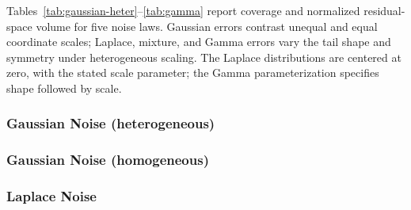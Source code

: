 Tables~\ref{tab:gaussian-heter}--\ref{tab:gamma} report coverage and
normalized residual-space volume for five noise laws. Gaussian errors
contrast unequal and equal coordinate scales; Laplace, mixture, and Gamma
errors vary the tail shape and symmetry under heterogeneous scaling.
The Laplace distributions are centered at zero, with the stated scale
parameter; the Gamma parameterization specifies shape followed by scale.

\subsubsection*{Gaussian Noise (heterogeneous)}

\begin{table}[H]
    \centering
    
    \caption{Performance of the proposed TSCP method and alternative conformal prediction approaches on simulated data with $d=10$ outcome variables, as in Figure~\ref{fig:gaussian-heter}. All results are averaged over $200$ trials with their one standard deviation reported in parenthesis.  
    The target coverage level is $0.9$. Coverage below this target is highlighted in \textcolor{red}{red}. For volume, lower is better. Smallest volume size (among those with valid theoretical coverage) is highlighted in \textbf{bold}. TSCP yields the tightest volume while maintaining valid coverage.}
    \label{tab:gaussian-heter}
\end{table}

\clearpage
\subsubsection*{Gaussian Noise (homogeneous)}

\begin{table}[H]
    \centering
    
    \caption{Performance of the proposed TSCP method and alternative conformal prediction approaches on simulated data with $d=10$ outcome variables, as in Figure~\ref{fig:gaussian-homo}. Other details are as in Table~\ref{tab:gaussian-heter}. In this case, Unscaled Max yields the tightest volume while maintaining valid coverage, while TSCP remains a competitive second. }
    \label{tab:gaussian-homo}
\end{table}

\clearpage
\subsubsection*{Laplace Noise}
\begin{table}[H]
    \centering
    
    \caption{Performance of the proposed TSCP method and alternative conformal prediction approaches on simulated data with $d=10$ outcome variables, and noise following a \emph{Laplace} distribution; i.e., $\epsilon _j \sim \mathrm{Laplace}(10-j+1)$ for all $j \in [10]$. Other details are as in Table~\ref{tab:gaussian-heter}.}
    \label{tab:laplace}
\end{table}

